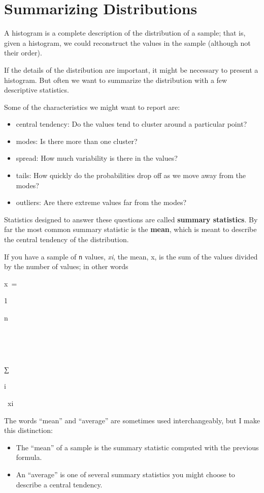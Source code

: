 \documentclass[]{book}
\providecommand{\tightlist}{%
  \setlength{\itemsep}{0pt}\setlength{\parskip}{0pt}}
\begin{document}
\hypertarget{summarizing-distributions}{%
\section{Summarizing Distributions}\label{summarizing-distributions}}

A histogram is a complete description of
the distribution of a sample; that is, given a histogram, we could
reconstruct the values in the sample (although not their order).

If the details of the distribution are
important, it might be necessary to present a histogram. But often we
want to summarize the distribution with a few descriptive
statistics.

Some of the characteristics we might want
to report are:

\begin{itemize}
\tightlist
\item
  central tendency: Do the values tend
  to cluster around a particular point?
\item
  modes: Is there more than one
  cluster?
\item
  spread: How much variability is there
  in the values?
\item
  tails: How quickly do the
  probabilities drop off as we move away from the modes?
\item
  outliers: Are there extreme values
  far from the modes?
\end{itemize}

Statistics designed to answer these
questions are called \textbf{summary statistics}. By far the most common summary statistic is the \textbf{mean},
which is meant to describe the central tendency of the distribution.

If you have a sample of \texttt{n} values, \emph{xi}, the mean, {x}, is the sum of the values
divided by the number of values; in other words

{x}~=~

1

{n}

~

~

{∑}

{i}

~{x}{i}~

The words ``mean'' and ``average'' are
sometimes used interchangeably, but I make this distinction:

\begin{itemize}
\tightlist
\item
  The ``mean'' of a sample is the summary
  statistic computed with the previous formula.
\item
  An ``average'' is one of several
  summary statistics you might choose to describe a central tendency.
\end{itemize}
\end{document}
